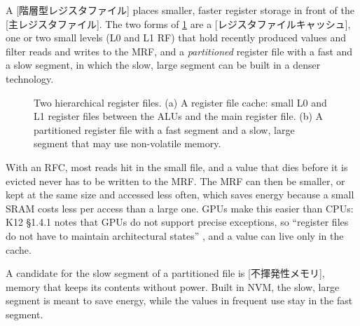 \documentclass[../main.tex]{subfiles}
\begin{document}
\begin{definition}
  \label{def:l06-hierarchical-rf}
  A [階層型レジスタファイル] places
  smaller, faster register storage in front of the
  [主レジスタファイル].  The two forms
  of \cref{fig:l06-rf-hierarchy} are a
  [レジスタファイルキャッシュ], one or
  two small levels (L0 and L1 RF) that hold recently produced values
  and filter reads and writes to the MRF, and a \emph{partitioned}
  register file with a fast and a slow segment, in which the slow,
  large segment can be built in a denser technology.
\end{definition}

\begin{figure}[tb]
  \centering
  
  \caption{Two hierarchical register files.  (a) A register file
    cache: small L0 and L1 register files between the ALUs and the main
    register file.  (b) A partitioned register file with a fast segment
    and a slow, large segment that may use non-volatile memory.}
  \label{fig:l06-rf-hierarchy}
\end{figure}

With an RFC, most reads hit in the small file, and a value that dies
before it is evicted never has to be written to the MRF.  The MRF can
then be smaller, or kept at the same size and accessed less often,
which saves energy because a small SRAM costs less per access than a
large one.  GPUs make this easier than CPUs:
K12 §1.4.1 notes that GPUs do not support precise exceptions, so
\enquote{register files do not have to maintain architectural states}
\cite{kim2012gpgpu}, and a value can live only in the cache.

A candidate for the slow segment of a partitioned file is
[不揮発性メモリ], memory that keeps its
contents without power.  Built in NVM, the slow, large segment is
meant to save energy, while the values in frequent use stay in the
fast segment.
\end{document}
